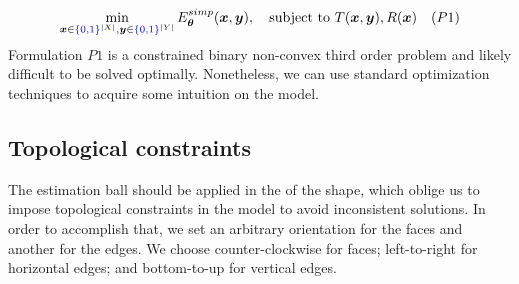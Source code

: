 \begin{align*}
	\min_{\bm{x} \in {\color{blue}{\{0,1\}}}^{|X|}, \bm{y} \in {\color{blue}{\{0,1\}}}^{|Y|}}{E_{\bm{\theta}}^{simp}(\bm{x},\bm{y})}, \quad \text{subject to } T(\bm{x},\bm{y}), R(\bm{x}) \quad (P1)
\end{align*}
%
	Formulation $P1$ is a constrained binary non-convex third order problem and likely difficult to be solved optimally. Nonetheless, we can use standard optimization techniques to acquire some intuition on the model. 	
	
\subsection{Topological constraints}
\label{ch5:subsec:topological-constraints}

The estimation ball should be applied in the  of the shape, which oblige us to impose topological constraints in the model to avoid inconsistent solutions. In order to accomplish that, we set an arbitrary orientation for the faces and another for the edges. We choose counter-clockwise for faces; left-to-right for horizontal edges; and bottom-to-up for vertical edges. 


